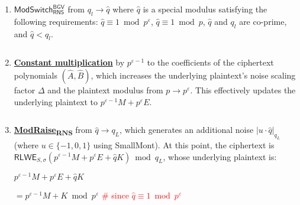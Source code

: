\begin{enumerate}

\item \textbf{\underline{$\textsf{ModSwitch}_{\textsf{RNS}}^{\textsf{BGV}}$}} from $q_l \rightarrow \hat{q}$ where $\hat{q}$ is a special modulus satisfying the following requirements: $\hat{q} \equiv 1 \bmod p^\varepsilon$, $\hat{q} \equiv 1 \bmod p$, $\hat{q}$ and $q_l$ are co-prime, and $\hat{q} < q_l$. 
\begin{comment}
This modulus switch is done by performing  \textsf{ModRaise\textsubscript{RNS}} from $q_l \rightarrow q_l\hat{q}$ and then $\textsf{ModSwitch}_{\textsf{RNS}}^{\textsf{BGV}}$ from $q_l\hat{q} \rightarrow \hat{q}$. 
The modulus switch updates the ciphertext from $(A, B) \bmod q_l$ to $(\hat{A}, \hat{B}) \bmod \hat{q}$.  Although \textsf{ModRaise\textsubscript{RNS}} from $q_l \rightarrow q_l\hat{q}$ would generate a $q_l$-multiple noise, the subsequent $\textsf{ModSwitch}_{\textsf{RNS}}^{\textsf{BGV}}$ $q_l\hat{q} \rightarrow \hat{q}$ divides this $q_l$-multiple noise by $q_l$, which will be later eliminated by the homomorphic digit extraction step. 
\end{comment}

$ $
 
\item \textbf{\underline{Constant multiplication}} by $p^{\varepsilon-1}$ to the coefficients of the ciphertext polynomials $(\hat{A}, \hat{B})$, which increases the underlying plaintext's noise scaling factor $\Delta$ and the plaintext modulus from $p \rightarrow p^{\varepsilon}$. This effectively updates the underlying plaintext to $p^{\varepsilon-1} M + p^{\varepsilon}E$. 

$ $

\item \textbf{\underline{\textsf{ModRaise\textsubscript{RNS}}}} from $\hat{q} \rightarrow q_L$, which generates an additional noise $|u\cdot \hat{q}|_{q_L}$ (where $u \in \{-1, 0, 1\}$ using \textsf{SmallMont}). At this point, the ciphertext is $\textsf{RLWE}_{S, \sigma}(p^{\varepsilon-1} M + p^{\varepsilon}E + \hat{q}K) \bmod q_L$, whose underlying plaintext is:

$p^{\varepsilon-1} M + p^{\varepsilon}E + \hat{q}K$

$= p^{\varepsilon-1} M + K \bmod p^{\varepsilon}$ \textcolor{red}{\# since $\hat{q} \equiv 1 \bmod p^{\varepsilon}$}

\end{enumerate}

